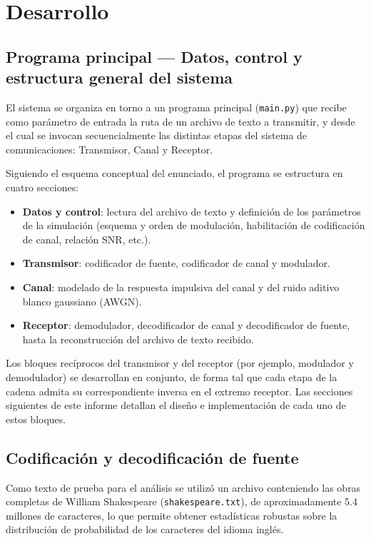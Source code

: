 \section{Desarrollo}

\subsection{Programa principal --- Datos, control y estructura general del sistema}

El sistema se organiza en torno a un programa principal (\texttt{main.py}) que recibe como
parámetro de entrada la ruta de un archivo de texto a transmitir, y desde el cual se invocan
secuencialmente las distintas etapas del sistema de comunicaciones: Transmisor, Canal y Receptor.

Siguiendo el esquema conceptual del enunciado, el programa se estructura en cuatro secciones:

\begin{itemize}
    \item \textbf{Datos y control}: lectura del archivo de texto y definición de los parámetros
    de la simulación (esquema y orden de modulación, habilitación de codificación de canal,
    relación SNR, etc.).
    \item \textbf{Transmisor}: codificador de fuente, codificador de canal y modulador.
    \item \textbf{Canal}: modelado de la respuesta impulsiva del canal y del ruido aditivo
    blanco gaussiano (AWGN).
    \item \textbf{Receptor}: demodulador, decodificador de canal y decodificador de fuente,
    hasta la reconstrucción del archivo de texto recibido.
\end{itemize}

Los bloques recíprocos del transmisor y del receptor (por ejemplo, modulador y demodulador) se
desarrollan en conjunto, de forma tal que cada etapa de la cadena admita su correspondiente
inversa en el extremo receptor. Las secciones siguientes de este informe detallan el diseño e
implementación de cada uno de estos bloques.

\subsection{Codificación y decodificación de fuente}

Como texto de prueba para el análisis se utilizó un archivo conteniendo las obras completas de William Shakespeare (\texttt{shakespeare.txt}), de aproximadamente
5.4 millones de caracteres, lo que permite obtener estadísticas robustas sobre la distribución de probabilidad de los caracteres del idioma inglés.

